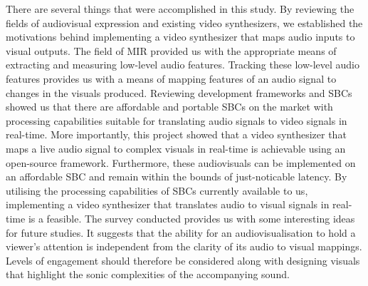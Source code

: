 \documentclass{report}
\begin{document}
There are several things that were accomplished in this study. By reviewing the fields of audiovisual expression and existing video synthesizers, we established the motivations behind implementing a video synthesizer that maps audio inputs to visual outputs. The field of MIR provided us with the appropriate means of extracting and measuring low-level audio features. Tracking these low-level audio features provides us with a means of mapping features of an audio signal to changes in the visuals produced. Reviewing development frameworks and SBCs showed us that there are affordable and portable SBCs on the market with processing capabilities suitable for translating audio signals to video signals in real-time. More importantly, this project showed that a video synthesizer that maps a live audio signal to complex visuals in real-time is achievable using an open-source framework. Furthermore, these audiovisuals can be implemented on an affordable SBC and remain within the bounds of just-noticable latency. By utilising the processing capabilities of SBCs currently available to us, implementing a video synthesizer that translates audio to visual signals in real-time is a feasible. The survey conducted provides us with some interesting ideas for future studies. It suggests that the ability for an audiovisualisation to hold a viewer's attention is independent from the clarity of its audio to visual mappings. Levels of engagement should therefore be considered along with designing visuals that highlight the sonic complexities of the accompanying sound.
\printbibliography

\begin{appendices}
  
\end{appendices}
\end{document}
